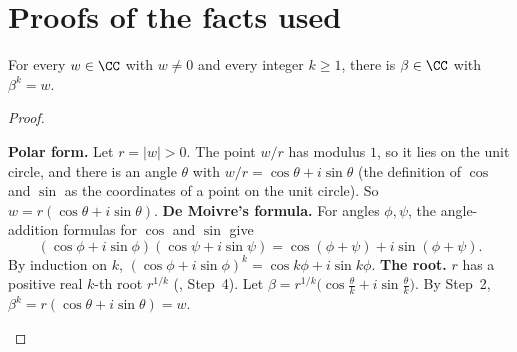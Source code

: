 \documentclass[10pt]{scrartcl}
\begin{document}
\clearpage
\section{Proofs of the facts used}

\begin{proposition*}
  For every $w\in\CC$ with $w\ne0$ and every integer $k\ge1$, there is $\beta\in\CC$ with $\beta^k=w$.
\end{proposition*}
\begin{proof}
  \begin{steps}
    \ii \textbf{Polar form.} Let $r=|w|>0$. The point $w/r$ has modulus $1$, so it lies on the unit circle, and there is an angle $\theta$ with $w/r=\cos\theta+i\sin\theta$ (the definition of $\cos$ and $\sin$ as the coordinates of a point on the unit circle). So $w=r(\cos\theta+i\sin\theta)$.
    \ii \textbf{De Moivre's formula.} For angles $\phi,\psi$, the angle-addition formulas for $\cos$ and $\sin$ give
    \[
      (\cos\phi+i\sin\phi)(\cos\psi+i\sin\psi)=\cos(\phi+\psi)+i\sin(\phi+\psi).
    \]
    By induction on $k$, $(\cos\phi+i\sin\phi)^k=\cos k\phi+i\sin k\phi$.
    \ii \textbf{The root.} $r$ has a positive real $k$-th root $r^{1/k}$ (, Step~4). Let $\beta=r^{1/k}\bigl(\cos\tfrac\theta k+i\sin\tfrac\theta k\bigr)$. By Step~2, $\beta^k=r(\cos\theta+i\sin\theta)=w$.
  \end{steps}
\end{proof}
\end{document}
